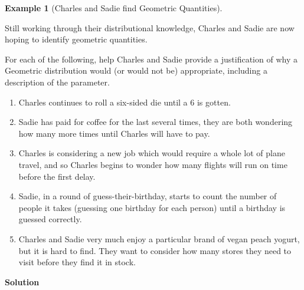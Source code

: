 \documentclass[
  letterpaper,
  DIV=11,
  numbers=noendperiod]{scrreprt}
\providecommand{\tightlist}{%
  \setlength{\itemsep}{0pt}\setlength{\parskip}{0pt}}\usepackage{longtable,booktabs,array}
\theoremstyle{definition}
\theoremstyle{definition}
\newtheorem{example}{Example}[chapter]
\theoremstyle{definition}
\theoremstyle{remark}
\begin{document}
\begin{example}[Charles and Sadie find Geometric
Quantities]\protect\hypertarget{exm-geometric-examples}{}\label{exm-geometric-examples}

Still working through their distributional knowledge, Charles and Sadie
are now hoping to identify geometric quantities.

For each of the following, help Charles and Sadie provide a
justification of why a Geometric distribution would (or would not be)
appropriate, including a description of the parameter.

\begin{enumerate}
\def\labelenumi{\alph{enumi}.}
\tightlist
\item
  Charles continues to roll a six-sided die until a \(6\) is gotten.
\item
  Sadie has paid for coffee for the last several times, they are both
  wondering how many more times until Charles will have to pay.
\item
  Charles is considering a new job which would require a whole lot of
  plane travel, and so Charles begins to wonder how many flights will
  run on time before the first delay.
\item
  Sadie, in a round of guess-their-birthday, starts to count the number
  of people it takes (guessing one birthday for each person) until a
  birthday is guessed correctly.
\item
  Charles and Sadie very much enjoy a particular brand of vegan peach
  yogurt, but it is hard to find. They want to consider how many stores
  they need to visit before they find it in stock.
\end{enumerate}

\begin{tcolorbox}[enhanced jigsaw, colback=white, colframe=quarto-callout-color-frame, arc=.35mm, leftrule=.75mm, rightrule=.15mm, opacityback=0, breakable, bottomrule=.15mm, left=2mm, toprule=.15mm]

\vspace{-3mm}\textbf{Solution}\vspace{3mm}


\end{tcolorbox}
\end{example}
\end{document}
